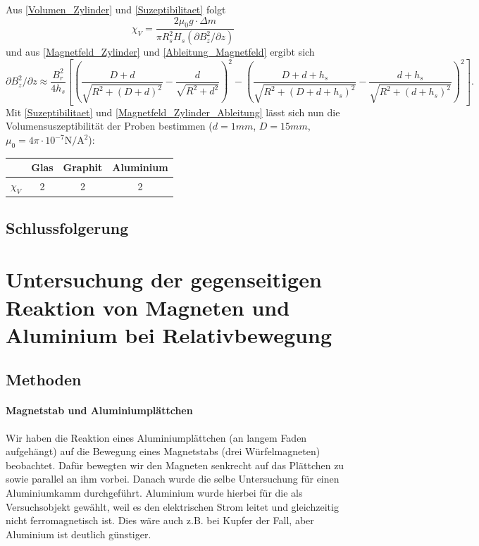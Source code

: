 \documentclass[
	a4paper,
	12pt,
	pagesize,
	ngerman
]{scrartcl}
\begin{document}
	Aus \cref{Volumen_Zylinder} und \cref{Suzeptibilitaet} folgt
	\begin{equation}
	\chi_V=\frac{2 \mu_0 g \cdot \Delta m}{\pi R_s^2 H_s(\partial B_z^2 /\partial z)}
	\end{equation}
	und aus \cref{Magnetfeld_Zylinder} und \cref{Ableitung_Magnetfeld} ergibt sich
		\begin{equation}
	\label{Magnetfeld_Zylinder_Ableitung}
	\partial B_z^2 /\partial z \approx \frac{B_r^2}{4h_s} \left[ \left( \frac{D+d}{\sqrt{R^2+(D+d)^2}}-\frac{d}{\sqrt{R^2 +d^2}}\right)^2 -\left( \frac{D+d+h_s}{\sqrt{R^2+(D+d+h_s)^2}} -\frac{d+h_s}{\sqrt{R^2+(d+h_s)^2}} \right)^2  \right].
	\end{equation}
	Mit \cref{Suzeptibilitaet} und \cref{Magnetfeld_Zylinder_Ableitung} lässt sich nun die Volumensuszeptibilität der Proben bestimmen ($d=1 \si{mm}$, $D=15 \si{mm}$, $ \mu_0 = 4 \pi \cdot 10^{-7} \si{\newton \per \ampere \squared}$): \newline
	\begin{tabular}{ r | c | c | c}
		& Glas & Graphit & Aluminium \\ \hline
		$\chi_V \si{}$ & 2 & 2 & 2\\ \hline
	\end{tabular} \newline
	
	\subsection{Schlussfolgerung}
	
	
	\section{Untersuchung der gegenseitigen Reaktion von Magneten und Aluminium bei Relativbewegung}
	\subsection{Methoden}
	\paragraph{Magnetstab und Aluminiumplättchen}
	Wir haben die Reaktion eines Aluminiumplättchen (an langem Faden aufgehängt) auf die Bewegung eines Magnetstabs (drei Würfelmagneten) beobachtet. Dafür bewegten wir den Magneten senkrecht auf das Plättchen zu sowie parallel an ihm vorbei.
	Danach wurde die selbe Untersuchung für einen Aluminiumkamm durchgeführt. Aluminium wurde hierbei für die als Versuchsobjekt gewählt, weil es den elektrischen Strom leitet und gleichzeitig nicht ferromagnetisch ist. Dies wäre auch z.B. bei Kupfer der Fall, aber Aluminium ist deutlich günstiger. %
\end{document}
